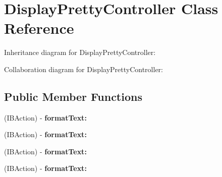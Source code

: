 \hypertarget{interface_display_pretty_controller}{
\section{\-Display\-Pretty\-Controller \-Class \-Reference}
\label{interface_display_pretty_controller}
}


\-Inheritance diagram for \-Display\-Pretty\-Controller\-:


\-Collaboration diagram for \-Display\-Pretty\-Controller\-:
\subsection*{\-Public \-Member \-Functions}
\begin{DoxyCompactItemize}
\item 
\hypertarget{interface_display_pretty_controller_a41979e7a6cf1ccd049fd0089d3b86db1}{
(\-I\-B\-Action) -\/ {\bfseries format\-Text\-:}}
\label{interface_display_pretty_controller_a41979e7a6cf1ccd049fd0089d3b86db1}

\item 
\hypertarget{interface_display_pretty_controller_a41979e7a6cf1ccd049fd0089d3b86db1}{
(\-I\-B\-Action) -\/ {\bfseries format\-Text\-:}}
\label{interface_display_pretty_controller_a41979e7a6cf1ccd049fd0089d3b86db1}

\item 
\hypertarget{interface_display_pretty_controller_a41979e7a6cf1ccd049fd0089d3b86db1}{
(\-I\-B\-Action) -\/ {\bfseries format\-Text\-:}}
\label{interface_display_pretty_controller_a41979e7a6cf1ccd049fd0089d3b86db1}

\item 
\hypertarget{interface_display_pretty_controller_a41979e7a6cf1ccd049fd0089d3b86db1}{
(\-I\-B\-Action) -\/ {\bfseries format\-Text\-:}}
\label{interface_display_pretty_controller_a41979e7a6cf1ccd049fd0089d3b86db1}

\end{DoxyCompactItemize}


